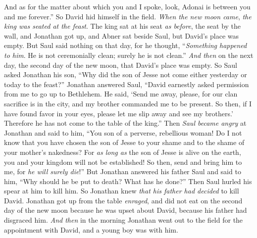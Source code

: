 \begin{biblechapter}
\verse And as for the matter about which you and I spoke, look, Adonai is between you and me forever.”
\verse So David hid himself in the field. \textit{When the new moon came}, \textit{the king was seated at the feast}.
\verse The king sat at his seat \textit{as before}, the seat by the wall, and Jonathan got up, and Abner sat beside Saul, but David’s place was empty.
\verse But Saul said nothing on that day, for he thought, “\textit{Something happened to him}. He is not ceremonially clean; surely he is not clean.”
\verse \textit{And then} on the next day, the second day of the new moon, that David’s place was empty. So Saul asked Jonathan his son, “Why did the son of Jesse not come either yesterday or today to the feast?”
\verse Jonathan answered Saul, “David earnestly asked permission from me to go up to Bethlehem.
\verse He said, ‘Send me away, please, for our clan sacrifice is in the city, and my brother commanded me to be present. So then, if I have found favor in your eyes, please let me slip away and see my brothers.’ Therefore he has not come to the table of the king.”
\verse Then \textit{Saul became angry} at Jonathan and said to him, “You son of a perverse, rebellious woman! Do I not know that you have chosen the son of Jesse to your shame and to the shame of your mother’s nakedness?
\verse For \textit{as long as} the son of Jesse is alive on the earth, you and your kingdom will not be established! So then, send and bring him to me, for \textit{he will surely die}!”
\verse But Jonathan answered his father Saul and said to him, “Why should he be put to death? What has he done?”
\verse Then Saul hurled his spear at him to kill him. So Jonathan knew \textit{that his father had decided} to kill David.
\verse Jonathan got up from the table \textit{enraged}, and did not eat on the second day of the new moon because he was upset about David, because his father had disgraced him.
\verse \textit{And then} in the morning Jonathan went out to the field for the appointment with David, and a young boy was with him.

\end{biblechapter}
